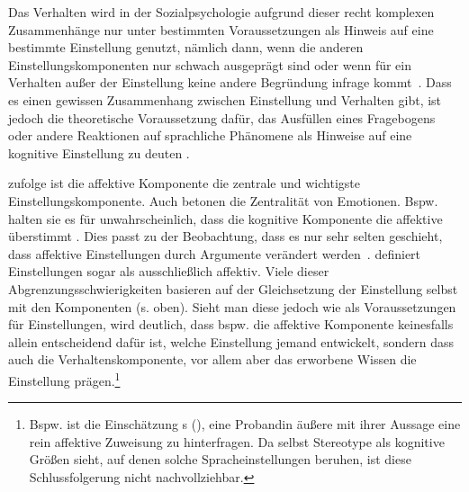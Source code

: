 Das Verhalten wird in der Sozialpsychologie aufgrund dieser recht komplexen Zusammenhänge nur unter bestimmten Voraussetzungen als Hinweis auf eine bestimmte Einstellung genutzt, n{\"a}mlich dann, wenn die anderen Einstellungskomponenten nur schwach ausgepr{\"a}gt sind oder wenn f{\"u}r ein Verhalten au{\ss}er der Einstellung keine andere Begr{\"u}ndung infrage kommt~\citep[s.][221]{Aronson.2014}. 
Dass es einen gewissen Zusammenhang zwischen Einstellung und Verhalten gibt, ist jedoch die theoretische Voraussetzung dafür, das Ausfüllen eines Fragebogens oder andere Reaktionen auf sprachliche Phänomene als Hinweise auf eine kognitive Einstellung zu deuten \citep[s.][401]{Lasagabaster.2005}.

\citet[78]{Hermanns.2002} zufolge ist die affektive Komponente die zentrale und wichtigste Einstellungskomponente. Auch \citet[222]{Cargile.1994} betonen die Zentralit{\"a}t von Emotionen. Bspw. halten sie es f{\"u}r unwahrscheinlich, dass die kognitive Komponente die affektive {\glqq}{\"u}berstimmt{\grqq} \citep[s.][222]{Cargile.1994}. 
Dies passt zu der Beobachtung, dass es nur sehr selten geschieht, dass affektive Einstellungen durch Argumente ver{\"a}ndert werden~\citep[s.][219]{Aronson.2014}. 
\citet[142]{Riehl.2000} definiert Einstellungen sogar als ausschließlich affektiv. 
Viele dieser Abgrenzungsschwierigkeiten basieren auf der Gleichsetzung der Einstellung selbst mit den Komponenten (s. oben). 
Sieht man diese jedoch wie \citet[]{Jonas.2014} als Voraussetzungen für Einstellungen, wird deutlich, dass bspw. die affektive Komponente keinesfalls allein entscheidend dafür ist, welche Einstellung jemand entwickelt, sondern dass auch die Verhaltenskomponente, vor allem aber das erworbene Wissen die Einstellung prägen.\footnote{Bspw. ist die Einschätzung \citeauthor{Riehl.2000}s (\citeyear[147]{Riehl.2000}), eine Probandin äußere mit ihrer Aussage  eine \glqq rein affektive Zuweisung\grqq{} zu hinterfragen. Da \citet[159]{Riehl.2000} selbst Stereotype als \glqq kognitive Größen\grqq{} sieht, auf denen solche Spracheinstellungen beruhen, ist diese Schlussfolgerung nicht nachvollziehbar.}

